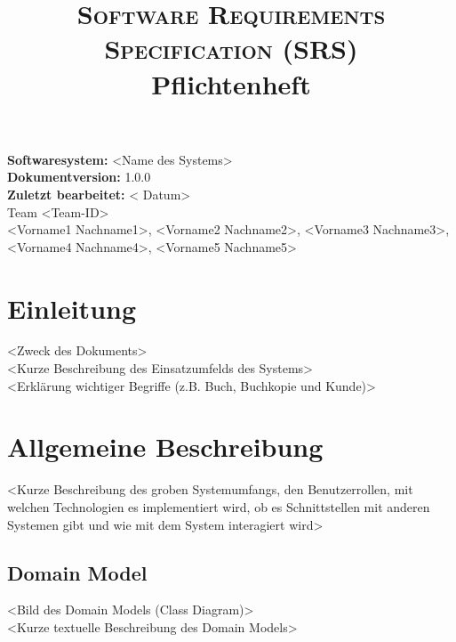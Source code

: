 \documentclass{article}
\title{
		\vspace{-3cm}
		\normalfont
		\normalsize
		\textsc{Software Requirements Specification (SRS)}\\
		\bigskip
		\huge{Pflichtenheft}
}
\date{\vspace{-7ex}}
\author{}
\begin{document}
\maketitle

\noindent\textbf{Softwaresystem:} \textless Name des Systems\textgreater\\
\noindent\textbf{Dokumentversion:} 1.0.0\\
\noindent\textbf{Zuletzt bearbeitet:} \textless
Datum\textgreater\\

\noindent Team \textless Team-ID\textgreater\\
\noindent \textless Vorname1 Nachname1\textgreater, \textless Vorname2 Nachname2\textgreater, \textless Vorname3 Nachname3\textgreater, \textless Vorname4 Nachname4\textgreater, \textless Vorname5 Nachname5\textgreater


\section{Einleitung}
\textless Zweck des Dokuments\textgreater\\
\textless Kurze Beschreibung des Einsatzumfelds des Systems\textgreater\\
\textless Erklärung wichtiger Begriffe (z.B. Buch, Buchkopie und Kunde)\textgreater



\section{Allgemeine Beschreibung}
\textless Kurze Beschreibung des groben Systemumfangs, den Benutzerrollen, mit welchen Technologien es implementiert wird, ob es Schnittstellen mit anderen Systemen gibt und wie mit dem System interagiert wird\textgreater

\subsection{Domain Model}
\textless Bild des Domain Models (Class Diagram)\textgreater\\
\textless Kurze textuelle Beschreibung des Domain Models\textgreater

\end{document}
